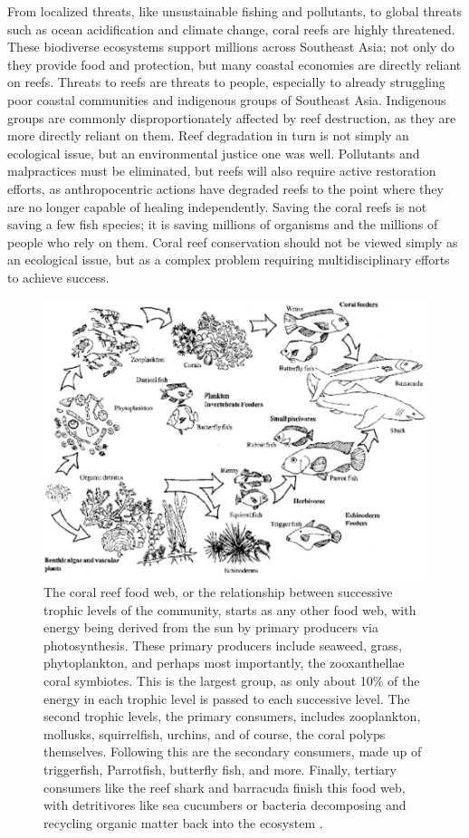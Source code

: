 \documentclass{book}\usepackage{knitr}
\begin{document}
From localized threats, like unsustainable fishing and pollutants, to global threats such as ocean acidification and climate change, coral reefs are highly threatened. These biodiverse ecosystems support millions across Southeast Asia; not only do they provide food and protection, but many coastal economies are directly reliant on reefs. Threats to reefs are threats to people, especially to already struggling poor coastal communities and indigenous groups of Southeast Asia. Indigenous groups are commonly disproportionately affected by reef destruction, as they are more directly reliant on them. Reef degradation in turn is not simply an ecological issue, but an environmental justice one was well. Pollutants and malpractices must be eliminated, but reefs will also require active restoration efforts, as anthropocentric actions have degraded reefs to the point where they are no longer capable of healing independently. Saving the coral reefs is not saving a few fish species; it is saving millions of organisms and the millions of people who rely on them. Coral reef conservation should not be viewed simply as an ecological issue, but as a complex problem requiring multidisciplinary efforts to achieve success.


\begin{figure}
\includegraphics[width=\linewidth]{images/reeffoodweb}
\caption{The coral reef food web, or the relationship between successive trophic levels of the community, starts as any other food web, with energy being derived from the sun by primary producers via photosynthesis. These primary producers include seaweed, grass, phytoplankton, and perhaps most importantly, the zooxanthellae coral symbiotes. This is the largest group, as only about 10\% of the energy in each trophic level is passed to each successive level. The second trophic levels, the primary consumers, includes zooplankton, mollusks, squirrelfish, urchins, and of course, the coral polyps themselves. Following this are the secondary consumers, made up of triggerfish, Parrotfish, butterfly fish, and more. Finally, tertiary consumers like the reef shark and barracuda finish this food web, with detritivores like sea cucumbers or bacteria decomposing and recycling organic matter back into the ecosystem \citep{https://doi.org/10.1890/15-1492.1}. }
\label{fig:Example Reef Food Web}
\end{figure}
\end{document}
